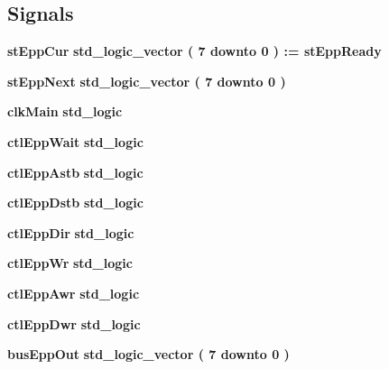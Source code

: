 \subsection*{Signals}
 \begin{DoxyCompactItemize}
\item 
{\bf st\-Epp\-Cur} {\bfseries \textcolor{comment}{std\-\_\-logic\-\_\-vector}\textcolor{vhdlchar}{ }\textcolor{vhdlchar}{(}\textcolor{vhdlchar}{ }\textcolor{vhdlchar}{ } \textcolor{vhdldigit}{7} \textcolor{vhdlchar}{ }\textcolor{vhdlchar}{ }\textcolor{vhdlchar}{ }\textcolor{vhdlkeyword}{downto}\textcolor{vhdlchar}{ }\textcolor{vhdlchar}{ }\textcolor{vhdlchar}{ } \textcolor{vhdldigit}{0} \textcolor{vhdlchar}{ }\textcolor{vhdlchar}{)}\textcolor{vhdlchar}{ }\textcolor{vhdlchar}{ }\textcolor{vhdlchar}{\-:}\textcolor{vhdlchar}{=}\textcolor{vhdlchar}{ }{\bfseries {\bf st\-Epp\-Ready}} \textcolor{vhdlchar}{ }} 
\item 
{\bf st\-Epp\-Next} {\bfseries \textcolor{comment}{std\-\_\-logic\-\_\-vector}\textcolor{vhdlchar}{ }\textcolor{vhdlchar}{(}\textcolor{vhdlchar}{ }\textcolor{vhdlchar}{ } \textcolor{vhdldigit}{7} \textcolor{vhdlchar}{ }\textcolor{vhdlchar}{ }\textcolor{vhdlchar}{ }\textcolor{vhdlkeyword}{downto}\textcolor{vhdlchar}{ }\textcolor{vhdlchar}{ }\textcolor{vhdlchar}{ } \textcolor{vhdldigit}{0} \textcolor{vhdlchar}{ }\textcolor{vhdlchar}{)}\textcolor{vhdlchar}{ }} 
\item 
{\bf clk\-Main} {\bfseries \textcolor{comment}{std\-\_\-logic}\textcolor{vhdlchar}{ }} 
\item 
{\bf ctl\-Epp\-Wait} {\bfseries \textcolor{comment}{std\-\_\-logic}\textcolor{vhdlchar}{ }} 
\item 
{\bf ctl\-Epp\-Astb} {\bfseries \textcolor{comment}{std\-\_\-logic}\textcolor{vhdlchar}{ }} 
\item 
{\bf ctl\-Epp\-Dstb} {\bfseries \textcolor{comment}{std\-\_\-logic}\textcolor{vhdlchar}{ }} 
\item 
{\bf ctl\-Epp\-Dir} {\bfseries \textcolor{comment}{std\-\_\-logic}\textcolor{vhdlchar}{ }} 
\item 
{\bf ctl\-Epp\-Wr} {\bfseries \textcolor{comment}{std\-\_\-logic}\textcolor{vhdlchar}{ }} 
\item 
{\bf ctl\-Epp\-Awr} {\bfseries \textcolor{comment}{std\-\_\-logic}\textcolor{vhdlchar}{ }} 
\item 
{\bf ctl\-Epp\-Dwr} {\bfseries \textcolor{comment}{std\-\_\-logic}\textcolor{vhdlchar}{ }} 
\item 
{\bf bus\-Epp\-Out} {\bfseries \textcolor{comment}{std\-\_\-logic\-\_\-vector}\textcolor{vhdlchar}{ }\textcolor{vhdlchar}{(}\textcolor{vhdlchar}{ }\textcolor{vhdlchar}{ } \textcolor{vhdldigit}{7} \textcolor{vhdlchar}{ }\textcolor{vhdlchar}{ }\textcolor{vhdlchar}{ }\textcolor{vhdlkeyword}{downto}\textcolor{vhdlchar}{ }\textcolor{vhdlchar}{ }\textcolor{vhdlchar}{ } \textcolor{vhdldigit}{0} \textcolor{vhdlchar}{ }\textcolor{vhdlchar}{)}\textcolor{vhdlchar}{ }} 

\end{DoxyCompactItemize}
